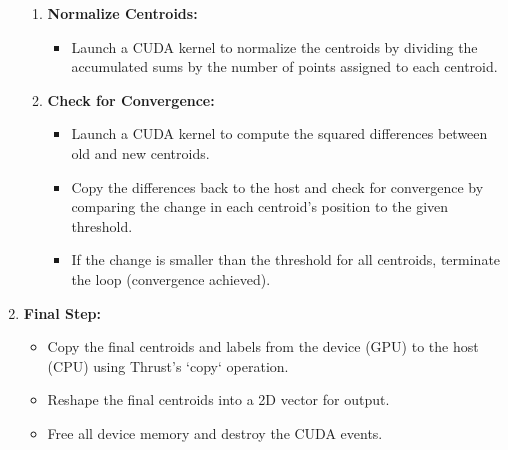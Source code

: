 \documentclass[letterpaper,12pt]{article}
\theoremstyle{remark}
\begin{document}
\begin{enumerate}
\begin{enumerate}
        \item \textbf{Normalize Centroids:}
        \begin{itemize}
            \item Launch a CUDA kernel to normalize the centroids by dividing the accumulated sums by the number of points assigned to each centroid.
        \end{itemize}

        \item \textbf{Check for Convergence:}
        \begin{itemize}
            \item Launch a CUDA kernel to compute the squared differences between old and new centroids.
            \item Copy the differences back to the host and check for convergence by comparing the change in each centroid’s position to the given threshold.
            \item If the change is smaller than the threshold for all centroids, terminate the loop (convergence achieved).
        \end{itemize}
    \end{enumerate}
    
    \item \textbf{Final Step:}
    \begin{itemize}
        \item Copy the final centroids and labels from the device (GPU) to the host (CPU) using Thrust's `copy` operation.
        \item Reshape the final centroids into a 2D vector for output.
        \item Free all device memory and destroy the CUDA events.
    \end{itemize}
\end{enumerate}
\end{document}
